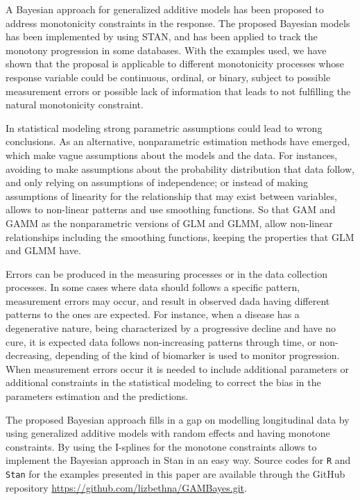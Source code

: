 \documentclass[11pt,letterpaper]{article}
\begin{document}
A Bayesian approach for generalized additive models has been proposed  to address  monotonicity constraints in the response. The proposed Bayesian models has been implemented by using STAN, and has been applied to track the monotony progression in some databases. 
With the examples used, we have shown that the proposal is applicable to different monotonicity processes whose response variable could be continuous,  ordinal, or  binary, subject to possible measurement errors or possible lack of information that leads to not fulfilling the natural monotonicity constraint. 



In statistical modeling strong parametric assumptions could lead to wrong conclusions.
As an alternative, nonparametric estimation methods have emerged, which make vague assumptions about the models and the data. 
For instances,  avoiding to make assumptions about the probability distribution that data follow,  and only relying on assumptions of independence; or instead of making assumptions of linearity for the relationship that may exist between variables, allows to non-linear patterns and use smoothing functions. 
So that GAM and GAMM as the nonparametric versions of GLM and GLMM, allow non-linear relationships including the smoothing functions, keeping the properties that GLM and GLMM have. 
 


Errors can be produced in the measuring processes or in the data collection processes. 
In some cases where data should follows a specific pattern, measurement errors may occur, and result in observed dada having different patterns to the ones are expected. For instance, when a disease has a degenerative nature,  being  characterized  by a progressive decline and have no cure, it is expected data follows non-increasing patterns through time, or non-decreasing, depending of the kind of biomarker  is used to monitor progression. 
When  measurement errors occur it is needed to include additional parameters or additional constraints in the statistical modeling to correct the bias in the parameters estimation and the predictions. 



The proposed Bayesian approach fills in a gap on modelling longitudinal data by using generalized additive models with random effects  and having monotone constraints. 
By using the I-splines for the monotone constraints allows to implement the Bayesian approach in Stan in an easy way. 
Source codes for \texttt{R} and \texttt{Stan} for the examples presented in this paper are available through the GitHub repository \url{https://github.com/lizbethna/GAMBayes.git}. 
\end{document}
